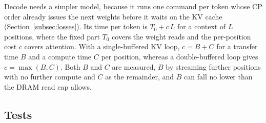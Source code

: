 Decode needs a simpler model, because it runs one command per token whose CP order already issues the next weights before it waits on the KV cache (Section~\ref{subsec:losses}).
Its time per token is $T_0 + c\,L$ for a context of $L$ positions, where the fixed part $T_0$ covers the weight reads and the per-position cost $c$ covers attention.
With a single-buffered KV loop, $c = B + C$ for a transfer time $B$ and a compute time $C$ per position, whereas a double-buffered loop gives $c = \max(B, C)$.
Both $B$ and $C$ are measured, $B$ by streaming further positions with no further compute and $C$ as the remainder, and $B$ can fall no lower than the DRAM read cap allows.



\subsection{Tests}
\label{subsec:tests}

